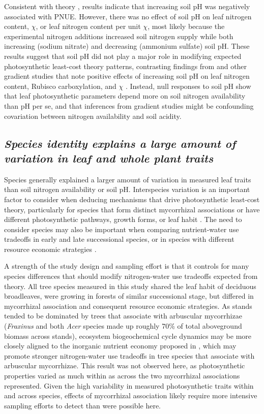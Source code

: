 Consistent with theory , results indicate that increasing soil pH was negatively associated with PNUE. However, there was no effect of soil pH on leaf nitrogen content, $\chi$, or leaf nitrogen content per unit $\chi$, most likely because the experimental nitrogen additions increased soil nitrogen supply while both increasing (sodium nitrate) and decreasing (ammonium sulfate) soil pH. These results suggest that soil pH did not play a major role in modifying expected photosynthetic least-cost theory patterns, contrasting findings from  and other gradient studies that note positive effects of increasing soil pH on leaf nitrogen content, Rubisco carboxylation, and $\chi$ . Instead, null responses to soil pH show that leaf photosynthetic parameters depend more on soil nitrogen availability than pH per se, and that inferences from gradient studies might be confounding covariation between nitrogen availability and soil acidity.

\subsection{\textit{Species identity explains a large amount of variation in leaf and whole plant traits}}
\noindent Species generally explained a larger amount of variation in measured leaf traits than soil nitrogen availability or soil pH. Interspecies variation is an important factor to consider when deducing mechanisms that drive photosynthetic least-cost theory, particularly for species that form distinct mycorrhizal associations or have different photosynthetic pathways, growth forms, or leaf habit . The need to consider species may also be important when comparing nutrient-water use tradeoffs in early and late successional species, or in species with different resource economic strategies .
    
A strength of the study design and sampling effort is that it controls for many species differences that should modify nitrogen-water use tradeoffs expected from theory. All tree species measured in this study shared the leaf habit of deciduous broadleaves, were growing in forests of similar successional stage, but differed in mycorrhizal association and consequent resource economic strategies. As stands tended to be dominated by trees that associate with arbuscular mycorrhizae (\textit{Fraxinus} and both \textit{Acer} species made up roughly 70\% of total aboveground biomass across stands), ecosystem biogeochemical cycle dynamics may be more closely aligned to the inorganic nutrient economy proposed in , which may promote stronger nitrogen-water use tradeoffs in tree species that associate with arbuscular mycorrhizae. This result was not observed here, as photosynthetic properties varied as much within as across the two mycorrhizal associations represented. Given the high variability in measured photosynthetic traits within and across species, effects of mycorrhizal association likely require more intensive sampling efforts to detect than were possible here.
    

